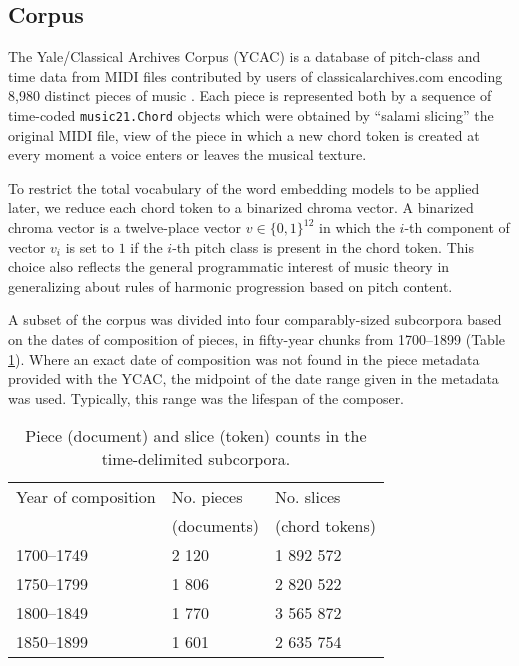 
\subsection{Corpus}\label{corpus}

The Yale/Classical Archives Corpus (YCAC) is a database of pitch-class
and time data from MIDI files contributed by users of
classicalarchives.com encoding 8,980 distinct pieces of music
\cite{white2014yale}. Each piece is represented both by a sequence of
time-coded \texttt{music21.Chord} objects which were obtained by ``salami slicing'' the original MIDI file, view of the piece in which a new chord token is created at every moment a voice enters or leaves the musical texture. 

To restrict the total vocabulary of the word embedding models to be applied later, we reduce each chord token to a binarized chroma vector. A binarized chroma vector is a twelve-place vector $v \in {\{0,1\}}^{12}$ in which the $i$-th component of vector $v_i$ is set to $1$ if the $i$-th pitch class is present in the chord token. This choice also reflects the general programmatic interest of music theory in generalizing about rules of harmonic progression based on pitch content.

A subset of the corpus was divided into four comparably-sized subcorpora based on the dates of composition of pieces, in fifty-year chunks from 1700--1899 (Table \ref{tab:counts}). Where an exact date of composition was not found in the piece metadata provided with the YCAC, the midpoint of the date range given in the metadata was used. Typically, this range was the lifespan of the composer.

\begin{table}
 \begin{center}
 \begin{tabular}{|l|l|l|}
  \hline
  Year of composition & No. pieces & No. slices \\
  & (documents) & (chord tokens) \\
\hline
\hline
1700--1749 & 2 120 & 1 892 572 \\
\hline
1750--1799 & 1 806 & 2 820 522 \\
\hline
1800--1849 & 1 770 & 3 565 872 \\
\hline
1850--1899 & 1 601 & 2 635 754 \\
\hline

 \end{tabular}
\end{center}
 \caption{Piece (document) and slice (token) counts in the time-delimited subcorpora.}
 \label{tab:counts}
\end{table}

